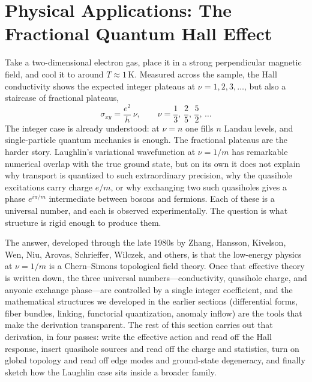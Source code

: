 
\section{Physical Applications: The Fractional Quantum Hall Effect}

Take a two-dimensional electron gas, place it in a strong perpendicular magnetic field, and cool it to around $T\approx 1\,\text{K}$. Measured across the sample, the Hall conductivity shows the expected integer plateaus at $\nu=1,2,3,\ldots$, but also a staircase of fractional plateaus,
\begin{equation}
  \sigma_{xy}
  =
  \frac{e^2}{h}\,\nu,
  \qquad
  \nu = \frac{1}{3},\,\frac{2}{5},\,\frac{5}{2},\,\ldots
  \label{eq:fqhe-conductance}
\end{equation}
The integer case is already understood: at $\nu=n$ one fills $n$ Landau levels, and single-particle quantum mechanics is enough. The fractional plateaus are the harder story. Laughlin's variational wavefunction at $\nu=1/m$ has remarkable numerical overlap with the true ground state, but on its own it does not explain why transport is quantized to such extraordinary precision, why the quasihole excitations carry charge $e/m$, or why exchanging two such quasiholes gives a phase $e^{i\pi/m}$ intermediate between bosons and fermions. Each of these is a universal number, and each is observed experimentally. The question is what structure is rigid enough to produce them.

The answer, developed through the late 1980s by Zhang, Hansson, Kivelson, Wen, Niu, Arovas, Schrieffer, Wilczek, and others, is that the low-energy physics at $\nu=1/m$ is a Chern--Simons topological field theory. Once that effective theory is written down, the three universal numbers---conductivity, quasihole charge, and anyonic exchange phase---are controlled by a single integer coefficient, and the mathematical structures we developed in the earlier sections (differential forms, fiber bundles, linking, functorial quantization, anomaly inflow) are the tools that make the derivation transparent. The rest of this section carries out that derivation, in four passes: write the effective action and read off the Hall response, insert quasihole sources and read off the charge and statistics, turn on global topology and read off edge modes and ground-state degeneracy, and finally sketch how the Laughlin case sits inside a broader family.

